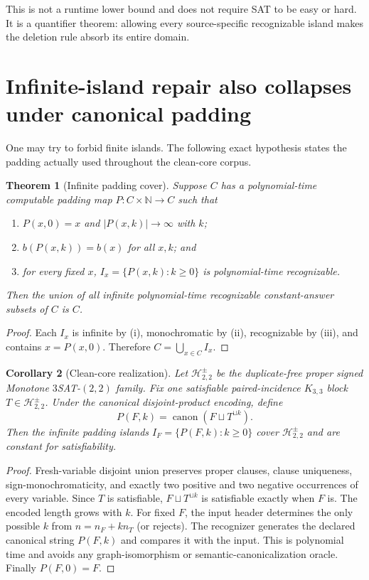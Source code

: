 \documentclass[11pt]{article}
\newcommand{\Htwo}{\mathcal H^{\pm}_{2,2}}
\newtheorem{theorem}{Theorem}
\newtheorem{corollary}[theorem]{Corollary}
\begin{document}
This is not a runtime lower bound and does not require SAT to be easy or hard.
It is a quantifier theorem: allowing every source-specific recognizable
island makes the deletion rule absorb its entire domain.

\section{Infinite-island repair also collapses under canonical padding}

One may try to forbid finite islands.  The following exact hypothesis states
the padding actually used throughout the clean-core corpus.

\begin{theorem}[Infinite padding cover]
Suppose $C$ has a polynomial-time computable padding map
$P:C\times\mathbb N\to C$ such that
\begin{enumerate}[label=(\roman*)]
\item $P(x,0)=x$ and $|P(x,k)|\to\infty$ with $k$;
\item $b(P(x,k))=b(x)$ for all $x,k$; and
\item for every fixed $x$, $I_x=\{P(x,k):k\ge0\}$ is polynomial-time
recognizable.
\end{enumerate}
Then the union of all infinite polynomial-time recognizable constant-answer
subsets of $C$ is $C$.
\end{theorem}

\begin{proof}
Each $I_x$ is infinite by (i), monochromatic by (ii), recognizable by (iii),
and contains $x=P(x,0)$.  Therefore $C=\bigcup_{x\in C}I_x$.
\end{proof}

\begin{corollary}[Clean-core realization]
Let $\Htwo$ be the duplicate-free proper signed Monotone
$3$SAT-$(2,2)$ family.  Fix one satisfiable paired-incidence $K_{3,3}$ block
$T\in\Htwo$.  Under the canonical disjoint-product encoding, define
\[
 P(F,k)=\operatorname{canon}(F\sqcup T^{\sqcup k}).      \tag{2}
\]
Then the infinite padding islands $I_F=\{P(F,k):k\ge0\}$ cover $\Htwo$ and
are constant for satisfiability.
\end{corollary}

\begin{proof}
Fresh-variable disjoint union preserves proper clauses, clause uniqueness,
sign-monochromaticity, and exactly two positive and two negative occurrences
of every variable.  Since $T$ is satisfiable,
$F\sqcup T^{\sqcup k}$ is satisfiable exactly when $F$ is.  The encoded
length grows with $k$.  For fixed $F$, the input header determines the only
possible $k$ from $n=n_F+k n_T$ (or rejects).  The recognizer generates the
declared canonical string $P(F,k)$ and compares it with the input.  This is
polynomial time and avoids any graph-isomorphism or semantic-canonicalization
oracle.  Finally $P(F,0)=F$.
\end{proof}
\end{document}
